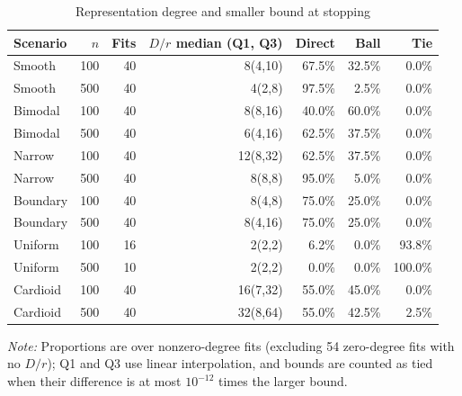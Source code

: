 \begin{table}[htbp]
\centering
\caption{Representation degree and smaller bound at stopping}\label{tab:t2}
\small
\setlength{\tabcolsep}{5pt}
\begin{tabular}{lrrrrrr}
\toprule
Scenario & \(n\) & Fits & \(D/r\) median (Q1, Q3) & Direct & Ball & Tie \\
\midrule
Smooth & 100 & 40 & 8(4,10) & 67.5\% & 32.5\% & 0.0\% \\
Smooth & 500 & 40 & 4(2,8) & 97.5\% & 2.5\% & 0.0\% \\
Bimodal & 100 & 40 & 8(8,16) & 40.0\% & 60.0\% & 0.0\% \\
Bimodal & 500 & 40 & 6(4,16) & 62.5\% & 37.5\% & 0.0\% \\
Narrow & 100 & 40 & 12(8,32) & 62.5\% & 37.5\% & 0.0\% \\
Narrow & 500 & 40 & 8(8,8) & 95.0\% & 5.0\% & 0.0\% \\
Boundary & 100 & 40 & 8(4,8) & 75.0\% & 25.0\% & 0.0\% \\
Boundary & 500 & 40 & 8(4,16) & 75.0\% & 25.0\% & 0.0\% \\
Uniform & 100 & 16 & 2(2,2) & 6.2\% & 0.0\% & 93.8\% \\
Uniform & 500 & 10 & 2(2,2) & 0.0\% & 0.0\% & 100.0\% \\
Cardioid & 100 & 40 & 16(7,32) & 55.0\% & 45.0\% & 0.0\% \\
Cardioid & 500 & 40 & 32(8,64) & 55.0\% & 42.5\% & 2.5\% \\
\bottomrule
\end{tabular}

\vspace{0.3em}
\footnotesize\textit{Note:} Proportions are over nonzero-degree fits (excluding 54 zero-degree fits with no \(D/r\)); Q1 and Q3 use linear interpolation, and bounds are counted as tied when their difference is at most \(10^{-12}\) times the larger bound.
\end{table}

